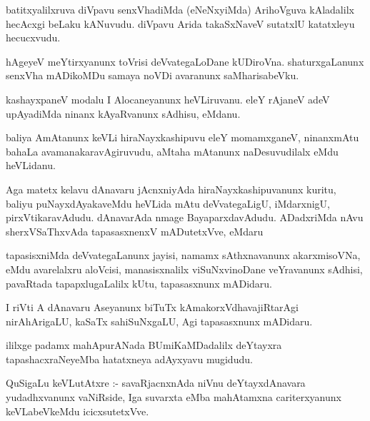 \documentclass{article}
\begin{document}
\begin{mn}
batitxyalilxruva diVpavu senxVhadiMda (eNeNxyiMda) ArihoVguva kAladalilx hecAcxgi
beLaku kANuvudu. diVpavu Arida takaSxNaveV sutatxlU katatxleyu hecucxvudu.
\end{mn}

\begin{mn}
hAgeyeV meYtirxyanunx toVrisi deVvategaLoDane kUDiroVna. shaturxgaLanunx
senxVha mADikoMDu samaya noVDi avaranunx saMharisabeVku.
\end{mn}

\begin{mn}
kashayxpaneV modalu I Alocaneyanunx heVLiruvanu. eleY rAjaneV adeV upAyadiMda 
ninanx kAyaRvanunx sAdhisu, eMdanu.
\end{mn}

\begin{mn}
baliya AmAtanunx keVLi hiraNayxkashipuvu eleY momamxganeV, ninanxmAtu bahaLa 
avamanakaravAgiruvudu, aMtaha mAtanunx naDesuvudilalx eMdu heVLidanu.
\end{mn}

\begin{mn}
Aga matetx kelavu dAnavaru jAcnxniyAda hiraNayxkashipuvanunx kuritu, baliyu
 puNayxdAyakaveMdu heVLida mAtu deVvategaLigU, iMdarxnigU, pirxVtikaravAdudu.
 dAnavarAda nmage BayaparxdavAdudu. ADadxriMda nAvu sherxVSaThxvAda 
 tapasasxnenxV mADutetxVve, eMdaru
\end{mn}

\begin{mn}
tapasisxniMda deVvategaLanunx jayisi, namamx sAthxnavanunx akarxmisoVNa, eMdu 
avarelalxru aloVcisi, manasisxnalilx viSuNxvinoDane veYravanunx sAdhisi, 
pavaRtada tapapxlugaLalilx kUtu, tapasasxnunx mADidaru.
\end{mn}

\begin{mn}
I riVti A dAnavaru Aseyanunx biTuTx kAmakorxVdhavajiRtarAgi nirAhArigaLU,
 kaSaTx sahiSuNxgaLU, Agi tapasasxnunx mADidaru.
\end{mn}

\begin{mn}
ililxge padamx mahApurANada BUmiKaMDadalilx deYtayxra tapashacxraNeyeMba hatatxneya adAyxyavu mugidudu.
\end{mn}


\begin{mn}
QuSigaLu keVLutAtxre :- savaRjacnxnAda niVnu deYtayxdAnavara yudadhxvanunx
 vaNiRside, Iga suvarxta eMba mahAtamxna cariterxyanunx  keVLabeVkeMdu icicxsutetxVve.
\end{mn}
\end{document}
